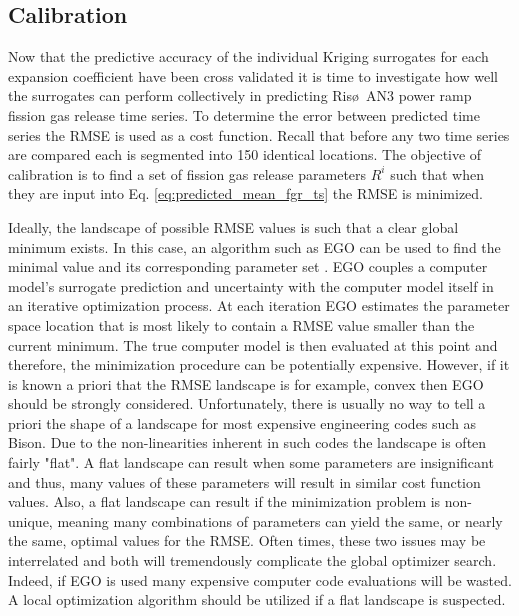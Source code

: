 \subsection{Calibration}
\label{subsec:calibration}

Now that the predictive accuracy of the individual Kriging surrogates for each expansion coefficient have been cross validated it is time to investigate how well the surrogates can perform collectively in predicting Ris\o~AN3 power ramp fission gas release time series. To determine the error between predicted time series the \ac{RMSE} is used as a cost function. Recall that before any two time series are compared each is segmented into 150 identical locations. The objective of calibration is to find a set of fission gas release parameters $R^i$ such that when they are input into Eq. \ref{eq:predicted_mean_fgr_ts} the \ac{RMSE} is minimized. 

Ideally, the landscape of possible \ac{RMSE} values is such that a clear global minimum exists. In this case, an algorithm such as \ac{EGO} can be used to find the minimal value and its corresponding parameter set \cite{Jones_Schonlau}. \ac{EGO} couples a computer model's surrogate prediction and uncertainty with the computer model itself in an iterative optimization process.  At each iteration \ac{EGO} estimates the parameter space location that is most likely to contain a \ac{RMSE} value smaller than the current minimum. The true computer model is then evaluated at this point and therefore, the minimization procedure can be potentially expensive. However, if it is known a priori that the \ac{RMSE} landscape is for example, convex then \ac{EGO} should be strongly considered. Unfortunately, there is usually no way to tell a priori the shape of a landscape for most expensive engineering codes such as Bison. Due to the non-linearities inherent in such codes the landscape is often fairly "flat". A flat landscape can result when some parameters are insignificant and thus, many values of these parameters will result in similar cost function values. Also, a flat landscape can result if the minimization problem is non-unique, meaning many combinations of parameters can yield the same, or nearly the same, optimal values for the \ac{RMSE}. Often times, these two issues may be interrelated and both will tremendously complicate the global optimizer search. Indeed, if \ac{EGO} is used many expensive computer code evaluations will be wasted. A local optimization algorithm should be utilized if a flat landscape is suspected.  

